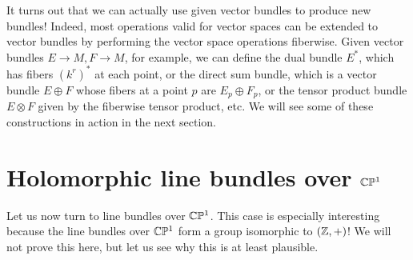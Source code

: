 \documentclass{../../mathnotes}
\begin{document}

It turns out that we can actually
use given vector bundles to produce new bundles! Indeed, most operations valid for vector spaces can be extended to vector bundles by performing the vector space
operations fiberwise. Given vector bundles $E\to M, F\to M$, for example, we can define the dual bundle $E^*$, which has fibers $(k^r)^*$ at each point,
or the direct sum bundle, which is a vector bundle $E\oplus F$ whose fibers at a point $p$ are $E_p\oplus F_p$, or the tensor product bundle $E\otimes F$ given by the
fiberwise tensor product, etc. \cite{hatchervectorbundles} We will see some of these constructions in action in the next section.


\section{Holomorphic line bundles over $\mathbb{C}\mathbb{P}^1$}

Let us now turn to line bundles over $\mathbb{C}\mathbb{P}^1$. This case is especially interesting because the line bundles over $\mathbb{C}\mathbb{P}^1$ form a group
isomorphic to $(\mathbb{Z},+)$! We will not prove this here, but let us see why this is at least plausible.
\end{document}
